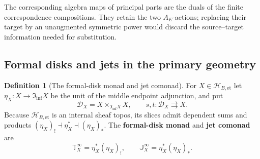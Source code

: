 \documentclass[11pt,a4paper]{article}
\numberwithin{algorithm}{section}
\numberwithin{equation}{section}
\theoremstyle{definition}
\newtheorem{definition}[definition]{Definition}
\theoremstyle{remark}
\theoremstyle{plain}
\newcommand{\InfShape}{\mathfrak I_{\mathrm{inf}}}
\newcommand{\ThickEt}{\mathscr H_{B,\mathrm{et}}}
\theoremstyle{definition}
\theoremstyle{plain}
\begin{document}
The corresponding algebra maps of principal parts are the duals
of the finite correspondence compositions.  They retain the two
$A_E$-actions; replacing their target by an unaugmented symmetric
power would discard the source--target information needed for
substitution.

\subsection{Formal disks and jets in the primary geometry}
\label{sec:jet-etale-primary}


\begin{definition}[The formal-disk monad and jet comonad]\label{def:formal-disk-jets}
For $X\in\ThickEt$ let $\eta_X:X\to\InfShape X$ be
the unit of the middle endpoint adjunction, and put
\[
 \mathcal D_X=X\times_{\InfShape X}X,
 \qquad s,t:\mathcal D_X\rightrightarrows X.
\]
Because $\ThickEt$ is an internal sheaf topos, its slices
admit dependent sums and products
$(\eta_X)_!\dashv\eta_X^*\dashv(\eta_X)_*$.
The \textbf{formal-disk monad} and \textbf{jet comonad} are
\[
 \mathbb T_X^\infty=\eta_X^*(\eta_X)_!,
 \qquad\mathbb J_X^\infty=\eta_X^*(\eta_X)_*.
\]
\end{definition}
\end{document}
